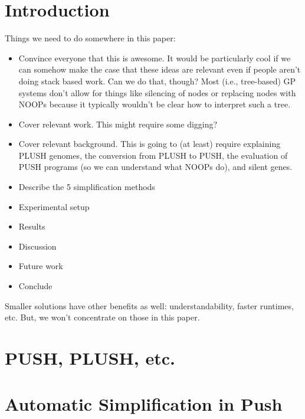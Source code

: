 \section{Introduction}
\label{sec:intro}


Things we need to do somewhere in this paper:
\begin{itemize}
	\item Convince everyone that this is awesome. It would be particularly cool if we can somehow make the case that these ideas are relevant even if people aren't doing stack based work. Can we do that, though? Most (i.e., tree-based)
	GP systems don't allow for things like silencing of nodes or replacing nodes
	with NOOPs because it typically wouldn't be clear how to interpret such a tree.
	\item Cover relevant work. This might require some digging?
	\item Cover relevant background. This is going to (at least) require explaining PLUSH genomes, the conversion from PLUSH to PUSH, the evaluation of PUSH programs (so we can understand what NOOPs do), and silent genes.
	\item Describe the 5 simplification methods
	\item Experimental setup
	\item Results
	\item Discussion
	\item Future work
	\item Conclude
\end{itemize}

Smaller solutions have other benefits as well: understandability, faster runtimes, etc. But, we won't concentrate on those in this paper.

\section{PUSH, PLUSH, etc.}
\label{sec:push}



\section{Automatic Simplification in Push}
\label{sec:simplification}

